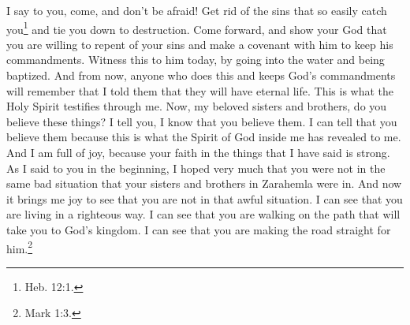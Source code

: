 \bverse \iffalse Yea, I say unto you come and fear not, and lay aside every sin, which easily doth beset you, which doth bind you down to destruction, yea, come and go forth, and show unto your God that ye are willing to repent of your sins and enter into a covenant with him to keep his commandments, and witness it unto him this day by going into the waters of baptism. \fi
I say to you, come, and don't be afraid! Get rid of the sins that so easily catch you\footnote{Heb. 12:1.} and tie you down to destruction. Come forward, and show your God that you are willing to repent of your sins and make a covenant with him to keep his commandments. Witness this to him today, by going into the water and being baptized.
\bverse \iffalse And whosoever doeth this, and keepeth the commandments of God from thenceforth, the same will remember that I say unto him, yea, he will remember that I have said unto him, he shall have eternal life, according to the testimony of the Holy Spirit, which testifieth in me. \fi
And from now, anyone who does this and keeps God's commandments will remember that I told them that they will have eternal life. This is what the Holy Spirit testifies through me.
\bverse \iffalse And now my beloved brethren, do you believe these things?  Behold, I say unto you, yea, I know that ye believe them; and the way that I know that ye believe them is by the manifestation of the Spirit which is in me. And now because your faith is strong concerning that, yea, concerning the things which I have spoken, great is my joy. \fi
Now, my beloved sisters and brothers, do you believe these things? I tell you, I know that you believe them. I can tell that you believe them because this is what the Spirit of God inside me has revealed to me. And I am full of joy, because your faith in the things that I have said is strong.
\bverse \iffalse For as I said unto you from the beginning, that I had much desire that ye were not in the state of dilemma like your brethren, even so I have found that my desires have been gratified. \fi
As I said to you in the beginning, I hoped very much that you were not in the same bad situation that your sisters and brothers in Zarahemla were in. And now it brings me joy to see that you are not in that awful situation.
\bverse \iffalse For I perceive that ye are in the paths of righteousness; I perceive that ye are in the path which leads to the kingdom of God; yea, I perceive that ye are making his paths straight. \fi
I can see that you are living in a righteous way. I can see that you are walking on the path that will take you to God's kingdom. I can see that you are making the road straight for him.\footnote{Mark 1:3.}
